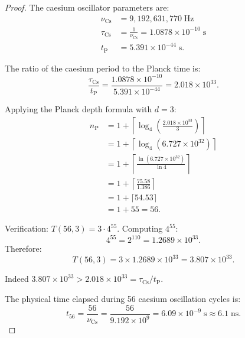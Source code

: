 \documentclass[twocolumn,10pt,a4paper]{article}
\theoremstyle{definition}
\theoremstyle{remark}
\newcommand{\tP}{t_{\mathrm{P}}}
\newcommand{\nP}{n_{\mathrm{P}}}
\begin{document}
\begin{proof}
The caesium oscillator parameters are:
\begin{align}
\nu_{\mathrm{Cs}} &= 9{,}192{,}631{,}770 \;\text{Hz} \nonumber \\
\tau_{\mathrm{Cs}} &= \frac{1}{\nu_{\mathrm{Cs}}} = 1.0878 \times 10^{-10}\;\text{s} \nonumber \\
\tP &= 5.391 \times 10^{-44}\;\text{s.}
\end{align}

The ratio of the caesium period to the Planck time is:
\begin{equation}
\frac{\tau_{\mathrm{Cs}}}{\tP} = \frac{1.0878 \times 10^{-10}}{5.391 \times 10^{-44}} = 2.018 \times 10^{33}.
\end{equation}

Applying the Planck depth formula with $d = 3$:
\begin{align}
\nP &= 1 + \left\lceil \log_4\!\left(\frac{2.018 \times 10^{33}}{3}\right) \right\rceil \nonumber \\
    &= 1 + \left\lceil \log_4\!\left(6.727 \times 10^{32}\right) \right\rceil \nonumber \\
    &= 1 + \left\lceil \frac{\ln(6.727 \times 10^{32})}{\ln 4} \right\rceil \nonumber \\
    &= 1 + \left\lceil \frac{75.58}{1.386} \right\rceil \nonumber \\
    &= 1 + \lceil 54.53 \rceil \nonumber \\
    &= 1 + 55 = 56.
\end{align}

Verification: $T(56, 3) = 3 \cdot 4^{55}$. Computing $4^{55}$:
\begin{equation}
4^{55} = 2^{110} = 1.2689 \times 10^{33}.
\end{equation}
Therefore:
\begin{equation}
T(56, 3) = 3 \times 1.2689 \times 10^{33} = 3.807 \times 10^{33}.
\end{equation}

Indeed $3.807 \times 10^{33} > 2.018 \times 10^{33} = \tau_{\mathrm{Cs}} / \tP$. \checkmark

The physical time elapsed during 56 caesium oscillation cycles is:
\begin{equation}
t_{56} = \frac{56}{\nu_{\mathrm{Cs}}} = \frac{56}{9.192 \times 10^9} = 6.09 \times 10^{-9}\;\text{s} \approx 6.1\;\text{ns}.
\end{equation}
\end{proof}
\end{document}
